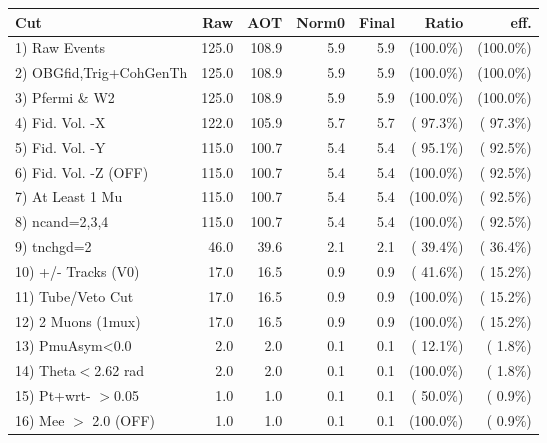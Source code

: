  \begin{table}[h!]\centering
 \begin{tabular}{||l||r|r|r|r|r|r||}
 \hline
 \hline
 Cut & Raw & AOT & Norm0 & Final & Ratio & eff.       \\
 \hline
  1) Raw Events           &        125.0 &        108.9 &          5.9 &          5.9 & (100.0\%) & (100.0\%) \\
  2) OBGfid,Trig+CohGenTh &        125.0 &        108.9 &          5.9 &          5.9 & (100.0\%) & (100.0\%) \\
  3) Pfermi \& W2         &        125.0 &        108.9 &          5.9 &          5.9 & (100.0\%) & (100.0\%) \\
  4) Fid. Vol. -X         &        122.0 &        105.9 &          5.7 &          5.7 & ( 97.3\%) & ( 97.3\%) \\
  5) Fid. Vol. -Y         &        115.0 &        100.7 &          5.4 &          5.4 & ( 95.1\%) & ( 92.5\%) \\
  6) Fid. Vol. -Z (OFF)   &        115.0 &        100.7 &          5.4 &          5.4 & (100.0\%) & ( 92.5\%) \\
  7) At Least 1 Mu        &        115.0 &        100.7 &          5.4 &          5.4 & (100.0\%) & ( 92.5\%) \\
  8) ncand=2,3,4          &        115.0 &        100.7 &          5.4 &          5.4 & (100.0\%) & ( 92.5\%) \\
  9) tnchgd=2             &         46.0 &         39.6 &          2.1 &          2.1 & ( 39.4\%) & ( 36.4\%) \\
 10) +/- Tracks (V0)      &         17.0 &         16.5 &          0.9 &          0.9 & ( 41.6\%) & ( 15.2\%) \\
 11) Tube/Veto Cut        &         17.0 &         16.5 &          0.9 &          0.9 & (100.0\%) & ( 15.2\%) \\
 12) 2 Muons (1mux)       &         17.0 &         16.5 &          0.9 &          0.9 & (100.0\%) & ( 15.2\%) \\
 13) PmuAsym<0.0          &          2.0 &          2.0 &          0.1 &          0.1 & ( 12.1\%) & (  1.8\%) \\
 14) Theta$<$2.62 rad     &          2.0 &          2.0 &          0.1 &          0.1 & (100.0\%) & (  1.8\%) \\
 15) Pt+wrt- $>$0.05      &          1.0 &          1.0 &          0.1 &          0.1 & ( 50.0\%) & (  0.9\%) \\
 16) Mee $>$ 2.0  (OFF)   &          1.0 &          1.0 &          0.1 &          0.1 & (100.0\%) & (  0.9\%) \\

\end{tabular}
\end{table}
